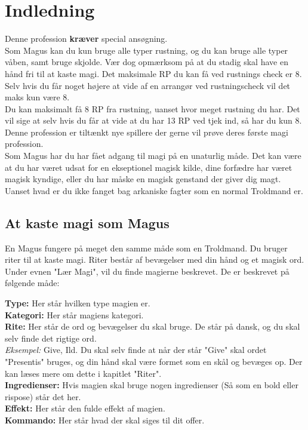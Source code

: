 \chapter{Indledning}

Denne profession \textbf{kræver} special ansøgning.\\
Som Magus kan du kun bruge alle typer rustning, og du kan bruge alle typer våben, samt bruge skjolde. Vær dog opmærksom på at du stadig skal have en hånd fri til at kaste magi. Det maksimale RP du kan få ved rustnings check er 8. Selv hvis du får noget højere at vide af en arrangør ved rustningscheck vil det maks kun være 8.\\
Du kan maksimalt få 8 RP fra rustning, uanset hvor meget rustning du har. Det vil sige at selv hvis du får at vide at du har 13 RP ved tjek ind, så har du kun 8.\\

Denne profession er tiltænkt nye spillere der gerne vil prøve deres første magi profession.\\

Som Magus har du har fået adgang til magi på en unaturlig måde. Det kan være at du har været udsat for en ekseptionel magisk kilde, dine forfædre har været magisk kyndige, eller du har måske en magisk genstand der giver dig magt. Uanset hvad er du ikke fanget bag arkaniske fagter som en normal Troldmand er.



\section{At kaste magi som Magus} 

En Magus fungere på meget den samme måde som en Troldmand. Du bruger riter til at kaste magi. Riter består af bevægelser med din hånd og et magisk ord. Under evnen "Lær Magi", vil du finde magierne beskrevet. De er beskrevet på følgende måde:
\begin{lærmagi*}
\textbf{Type:} Her står hvilken type magien er.\\
\textbf{Kategori:} Her står magiens kategori.\\
\textbf{Rite:} Her står de ord og bevægelser du skal bruge. De står på dansk, og du skal selv finde det rigtige ord.\\
\textit{Eksempel:} Give, Ild. Du skal selv finde at når der står "Give" skal ordet "Presentis" bruges, og din hånd skal være formet som en skål og bevæges op. Der kan læses mere om dette i kapitlet "Riter".\\
\textbf{Ingredienser:} Hvis magien skal bruge nogen ingredienser (Så som en bold eller rispose) står det her.\\
\textbf{Effekt:} Her står den fulde effekt af magien.\\
\textbf{Kommando:} Her står hvad der skal siges til dit offer.\\
\end{lærmagi*}


